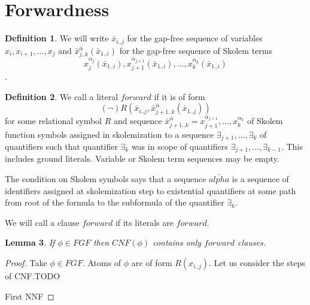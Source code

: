 \documentclass[english, shortabstract]{iithesis}
\theoremstyle{definition} \newtheorem{definition}{Definition}[chapter]
\theoremstyle{remark} \newtheorem{remark}[definition]{Observation}
\theoremstyle{plain} \newtheorem{theorem}[definition]{Theorem}
\theoremstyle{plain} \newtheorem{lemma}[definition]{Lemma}
\begin{document}
\section{Forwardness}

\begin{definition}\label{def:notation}
We will write $\bar{x}_{i..j}$ for the gap-free sequence of variables $x_i, x_{i+1}, \dots, x_j$ and 
$\bar{x}^{\bar{\alpha}}_{j..k}(\bar{x}_{1..i})$ for the gap-free sequence of Skolem terms
$$x^{\alpha_{j}}_{j}(\bar{x}_{1..i}), x^{\alpha_{j+1}}_{j+1}(\bar{x}_{1..i}), \dots, x^{\alpha_k}_k(\bar{x}_{1..i})$$.
\end{definition}

\begin{definition}\label{def:forward}
We call a literal $forward$ if it is of form
$$(\lnot)R(\bar{x}_{i..j}, \bar{x}^{\bar{\alpha}}_{{j+1..k}}(\bar{x}_{1..j}))$$
for some relational symbol $R$
and sequence $\bar{x}^{\bar{\alpha}}_{{j+1..k}}=x^{\alpha_{j+1}}_{j+1}, \dots, x^{\alpha_{k}}_{k}$ of 
Skolem function symbols assigned in skolemization to a sequence $\exists_{j+1}, \dots, \exists_{k}$ of quantifiers 
such that quantifier $\exists_{k}$ was in scope of quantifiers $\exists_{j+1}, \dots, \exists_{k-1}$.
This includes ground literals. Variable or Skolem term sequences may be empty.
\end{definition}

The condition on Skolem symbols says that a sequence $\bar{alpha}$ is a
sequence of identifiers assigned at skolemization step to existential quantifiers
at some path from root of the formula to the subformula of the quantifier $\exists_k$.

We will call a clause $forward$ if its literals are $forward$.

\begin{lemma}
If $\phi \in \mathit{FGF}$ then $CNF(\phi)$ contains only $forward$ clauses.
\end{lemma}

\begin{proof}
Take $\phi \in \mathit{FGF}$. Atoms of $\phi$ are of form $R(x_{i..j})$.
Let us consider the steps of CNF.TODO

First NNF
\end{proof}
\end{document}
